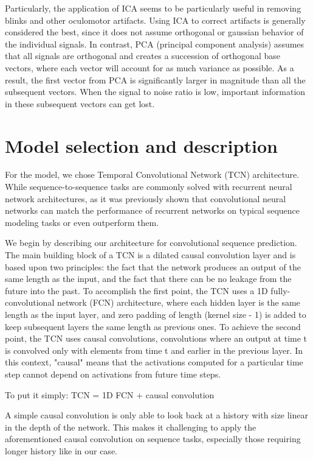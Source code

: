 \documentclass[12pt,a4paper,titlepage,openany]{report}
\begin{document}
Particularly, the application of ICA seems to be particularly useful in removing blinks and other oculomotor artifacts. Using ICA to correct artifacts is generally considered the best, since it does not assume orthogonal or gaussian behavior of the individual signals. 
In contrast, PCA (principal component analysis) assumes that all signals are orthogonal and creates a succession of orthogonal base vectors, where each vector will account for as much variance as possible. 
As a result, the ﬁrst vector from PCA is signiﬁcantly larger in magnitude than all the subsequent vectors. 
When the signal to noise ratio is low, important information in these subsequent vectors can get lost.\cite{makkar2023}

\section{Model selection and description}

For the model, we chose Temporal Convolutional Network (TCN) architecture. While sequence-to-sequence tasks are commonly solved with recurrent neural network architectures, as it was previously shown that convolutional neural networks can match the performance of recurrent networks on typical sequence modeling tasks or even outperform them.

We begin by describing our architecture for convolutional sequence prediction. The main building block of a TCN is a dilated causal convolution layer and is based upon two principles: the fact that the network produces an output of the same length as the input, and the fact that there can be no leakage from the future into the past. To accomplish the first point, the TCN uses a 1D fully-convolutional network (FCN) architecture, where each hidden layer is the same length as the input layer, and zero padding of length (kernel size - 1) is added to keep subsequent layers the same length as previous ones. To achieve the second point, the TCN uses causal convolutions, convolutions where an output at time t is convolved only with elements from time t and earlier in the previous layer. In this context, "causal" means that the activations computed for a particular time step cannot depend on activations from future time steps.

To put it simply: TCN = 1D FCN + causal convolution 

A simple causal convolution is only able to look back at a history with size linear in the depth of the network. This makes it challenging to apply the aforementioned causal convolution on sequence tasks, especially those requiring longer history like in our case.
\end{document}
